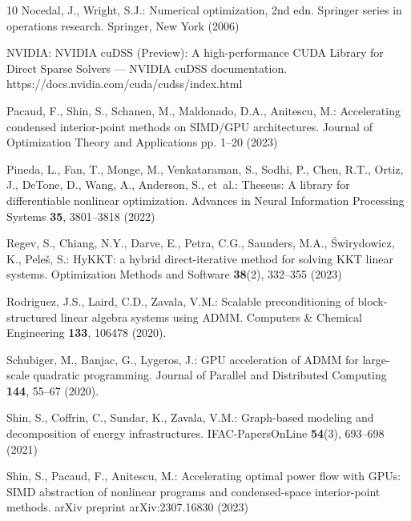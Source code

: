 \documentclass[smallextended]{svjour3}
\begin{document}
\begin{thebibliography}{10}
Nocedal, J., Wright, S.J.: Numerical optimization, 2nd edn.
\newblock Springer series in operations research. Springer, New York (2006)

NVIDIA: {{NVIDIA cuDSS}} ({{Preview}}): {{A}} high-performance {{CUDA Library}} for {{Direct Sparse Solvers}} --- {{NVIDIA cuDSS}} documentation.
\newblock https://docs.nvidia.com/cuda/cudss/index.html

Pacaud, F., Shin, S., Schanen, M., Maldonado, D.A., Anitescu, M.: Accelerating condensed interior-point methods on {SIMD/GPU} architectures.
\newblock Journal of Optimization Theory and Applications pp. 1--20 (2023)

Pineda, L., Fan, T., Monge, M., Venkataraman, S., Sodhi, P., Chen, R.T., Ortiz, J., DeTone, D., Wang, A., Anderson, S., et~al.: Theseus: A library for differentiable nonlinear optimization.
\newblock Advances in Neural Information Processing Systems \textbf{35}, 3801--3818 (2022)

Regev, S., Chiang, N.Y., Darve, E., Petra, C.G., Saunders, M.A., {\'S}wirydowicz, K., Pele{\v{s}}, S.: {HyKKT}: a hybrid direct-iterative method for solving {KKT} linear systems.
\newblock Optimization Methods and Software \textbf{38}(2), 332--355 (2023)

Rodriguez, J.S., Laird, C.D., Zavala, V.M.: Scalable preconditioning of block-structured linear algebra systems using {{ADMM}}.
\newblock Computers \& Chemical Engineering \textbf{133}, 106478 (2020).
\newblock {}

Schubiger, M., Banjac, G., Lygeros, J.: {{GPU}} acceleration of {{ADMM}} for large-scale quadratic programming.
\newblock Journal of Parallel and Distributed Computing \textbf{144}, 55--67 (2020).
\newblock {}

Shin, S., Coffrin, C., Sundar, K., Zavala, V.M.: Graph-based modeling and decomposition of energy infrastructures.
\newblock IFAC-PapersOnLine \textbf{54}(3), 693--698 (2021)

Shin, S., Pacaud, F., Anitescu, M.: Accelerating optimal power flow with {GPUs}: {SIMD} abstraction of nonlinear programs and condensed-space interior-point methods.
\newblock arXiv preprint arXiv:2307.16830  (2023)


\end{thebibliography}
\end{document}
